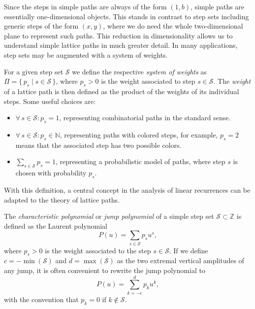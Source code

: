Since the steps in simple paths are always of the form $(1,b)$, simple paths are essentially one-dimensional objects. This stands in contrast to step sets including generic steps of the form $(x,y)$, where we do need the whole two-dimensional plane to represent such paths. This reduction in dimensionality allows us to understand simple lattice paths in much greater detail.
In many applications, step sets may be augmented with a system of weights.

\begin{definition}
  For a given step set $\mathcal{S}$ we define the respective \textit{system of weights} as $\Pi = \{\, p_s \mid s \in \mathcal{S} \,\}$, where $p_s > 0$ is the weight associated to step $s \in \mathcal{S}$.
  The \textit{weight} of a lattice path is then defined as the product of the weights of its individual steps.
  Some useful choices are:
  \begin{itemize}
    \item $\forall \, s \in \mathcal{S} \colon p_s = 1$, representing combinatorial paths in the standard sense.
    \item $\forall \, s \in \mathcal{S} \colon p_s \in \mathbb{N}$, representing paths with colored steps, for example, $p_s = 2$ means that the associated step has two possible colors.
    \item $\sum_{s \in \mathcal{S}} p_s = 1$, representing a probabilistic model of paths, where step $s$ is chosen with probability $p_s$. 
  \end{itemize}
\end{definition}

With this definition, a central concept in the analysis of linear recurrences can be adapted to the theory of lattice paths.

\begin{definition}
  The \textit{characteristic polynomial} or \textit{jump polynomial} of a simple step set $\mathcal{S} \subset \mathbb{Z}$ is defined as the Laurent polynomial
  $$
    P(u) = \sum_{s \in \mathcal{S}} p_s u^s,
  $$
  where $p_s > 0$ is the weight associated to the step $s \in \mathcal{S}$.
  If we define $c = - \min(\mathcal{S})$ and $d = \max(\mathcal{S})$ as the two extremal vertical amplitudes of any jump, it is often convenient to rewrite the jump polynomial to
  $$
    P(u) = \sum_{k = -c}^d p_k u^k,
  $$
  with the convention that $p_k = 0$ if $k \notin \mathcal{S}$.
\end{definition}

